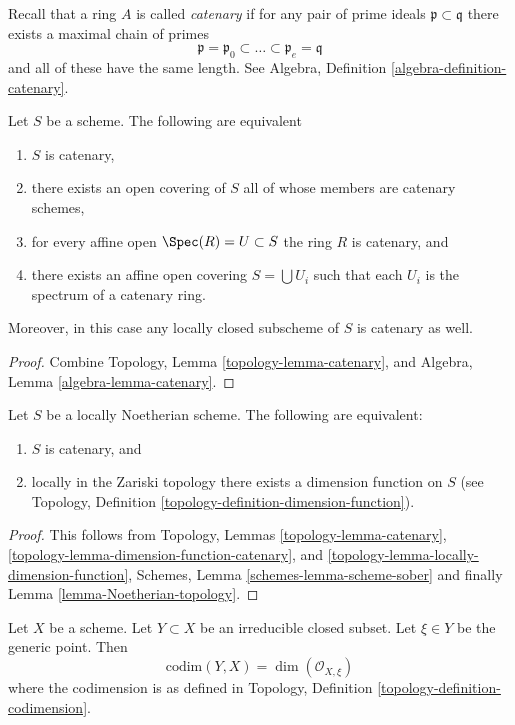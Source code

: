 \noindent
Recall that a ring $A$ is called {\it catenary} if
for any pair of prime ideals $\mathfrak p \subset \mathfrak q$
there exists a maximal chain of primes
$$
\mathfrak p =
\mathfrak p_0 \subset \ldots \subset \mathfrak p_e
= \mathfrak q
$$
and all of these have the same length. See
Algebra, Definition \ref{algebra-definition-catenary}.

\begin{lemma}
\label{lemma-catenary-local}
Let $S$ be a scheme. The following are equivalent
\begin{enumerate}
\item $S$ is catenary,
\item there exists an open covering of $S$ all of whose members are
catenary schemes,
\item for every affine open $\Spec(R) = U \subset S$ the ring
$R$ is catenary, and
\item there exists an affine open covering $S = \bigcup U_i$ such
that each $U_i$ is the spectrum of a catenary ring.
\end{enumerate}
Moreover, in this case any locally closed subscheme of $S$ is catenary
as well.
\end{lemma}

\begin{proof}
Combine Topology, Lemma \ref{topology-lemma-catenary}, and
Algebra, Lemma \ref{algebra-lemma-catenary}.
\end{proof}

\begin{lemma}
\label{lemma-catenary-dimension-function}
Let $S$ be a locally Noetherian scheme.
The following are equivalent:
\begin{enumerate}
\item $S$ is catenary, and
\item locally in the Zariski topology there exists a dimension function
on $S$ (see Topology, Definition \ref{topology-definition-dimension-function}).
\end{enumerate}
\end{lemma}

\begin{proof}
This follows from
Topology, Lemmas
\ref{topology-lemma-catenary},
\ref{topology-lemma-dimension-function-catenary}, and
\ref{topology-lemma-locally-dimension-function},
Schemes, Lemma \ref{schemes-lemma-scheme-sober}
and finally Lemma \ref{lemma-Noetherian-topology}.
\end{proof}

\begin{lemma}
\label{lemma-codimension-local-ring}
Let $X$ be a scheme. Let $Y \subset X$ be an irreducible closed
subset. Let $\xi \in Y$ be the generic point. Then
$$
\text{codim}(Y, X) = \dim(\mathcal{O}_{X, \xi})
$$
where the codimension is as defined in
Topology, Definition \ref{topology-definition-codimension}.
\end{lemma}

